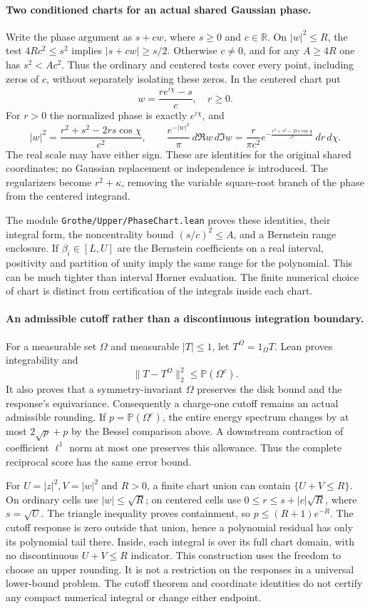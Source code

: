 \paragraph{Two conditioned charts for an actual shared Gaussian phase.}
Write the phase argument as $s+cw$, where $s\ge0$ and $c\in\mathbb R$.
On $|w|^2\le R$, the test $4Rc^2\le s^2$ implies
$|s+cw|\ge s/2$. Otherwise $c\ne0$, and for any $A\ge4R$ one has
$s^2<Ac^2$. Thus the ordinary and centered tests cover every point,
including zeros of $c$, without separately isolating these zeros.
In the centered chart put
\[
 w=\frac{re^{i\chi}-s}{c},\quad r\ge0.
\]
For $r>0$ the normalized phase is exactly $e^{i\chi}$, and
\[
 |w|^2=\frac{r^2+s^2-2rs\cos\chi}{c^2},\qquad
 \frac{e^{-|w|^2}}\pi\,d\Re w\,d\Im w
 =\frac r{\pi c^2}e^{-\frac{r^2+s^2-2rs\cos\chi}{c^2}}\,dr\,d\chi.
\]
The real scale may have either sign. These are identities for the original
shared coordinates; no Gaussian replacement or independence is introduced.
The regularizers become $r^2+\kappa$, removing the variable square-root
branch of the phase from the centered integrand.

The module \texttt{Grothe/Upper/PhaseChart.lean} proves these identities,
their integral form, the noncentrality bound $(s/c)^2\le A$, and a Bernstein
range enclosure. If $\beta_i\in[L,U]$ are the Bernstein coefficients on a
real interval, positivity and partition of unity imply the same range for
the polynomial. This can be much tighter than interval Horner evaluation.
The finite numerical choice of chart is distinct from certification of the
integrals inside each chart.

\paragraph{An admissible cutoff rather than a discontinuous integration boundary.}
For a measurable set $\Omega$ and measurable $|T|\le1$, let
$T^\Omega=1_\Omega T$. Lean proves integrability and
\[
 \|T-T^\Omega\|_2^2\le\mathbb P(\Omega^c).
\]
It also proves that a symmetry-invariant $\Omega$ preserves the disk bound
and the response's equivariance. Consequently a charge-one cutoff remains
an actual admissible rounding. If $p=\mathbb P(\Omega^c)$, the entire energy
spectrum changes by at most $2\sqrt p+p$ by the Bessel comparison above.
A downstream contraction of coefficient $\ell^1$ norm at most one preserves
this allowance. Thus the complete reciprocal score has the same error bound.

For $U=|z|^2,V=|w|^2$ and $R>0$, a finite chart union can contain
$\{U+V\le R\}$. On ordinary cells use $|w|\le\sqrt R$; on centered
cells use $0\le r\le s+|c|\sqrt R$, where $s=\sqrt U$. The triangle
inequality proves containment, so $p\le(R+1)e^{-R}$.
The cutoff response is zero outside that union, hence a polynomial residual
has only its polynomial tail there. Inside, each integral is over its full
chart domain, with no discontinuous $U+V\le R$ indicator.
This construction uses the freedom to choose an upper rounding. It is not
a restriction on the responses in a universal lower-bound problem.
The cutoff theorem and coordinate identities do not certify any compact
numerical integral or change either endpoint.

